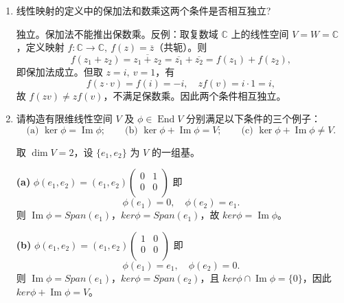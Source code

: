 \documentclass[lang=cn,12pt]{elegantbook}
\begin{document}
\begin{example}
    \begin{enumerate}
        \item[(1)] 线性映射的定义中的保加法和数乘这两个条件是否相互独立?
    
        \begin{solution}
            独立。保加法不能推出保数乘。反例：取复数域 \(\mathbb{C}\) 上的线性空间 \(V = W = \mathbb{C}\)，定义映射 \(f: \mathbb{C} \to \mathbb{C},\ f(z) = \overline{z}\)（共轭）。则
            \[
            f(z_1 + z_2) = \overline{z_1 + z_2} = \overline{z_1} + \overline{z_2} = f(z_1) + f(z_2),
            \]
            即保加法成立。但取 \(z = i,\ v = 1\)，有
            \[
            f(z \cdot v) = f(i) = -i,\quad z f(v) = i \cdot 1 = i,
            \]
            故 \(f(z v) \neq z f(v)\)，不满足保数乘。因此两个条件相互独立。
        \end{solution}
    
        \item[(2)] 请构造有限维线性空间 \(V\) 及 \(\phi \in \operatorname{End}V\) 分别满足以下条件的三个例子：
        \[
        \text{(a) } \ker \phi = \operatorname{Im} \phi;\qquad
        \text{(b) } \ker \phi + \operatorname{Im} \phi = V;\qquad
        \text{(c) } \ker \phi + \operatorname{Im} \phi \neq V.
        \]
    
        \begin{solution}
            取 \(\dim V = 2\)，设 \(\{e_1, e_2\}\) 为 \(V\) 的一组基。
    
            \textbf{(a)}  \(\phi(e_1,e_2) = (e_1,e_2)\begin{pmatrix}
                0 & 1 \\
                0 &  0\\
                \end{pmatrix}\) 即
            \[
            \phi(e_1) = 0,\quad \phi(e_2) = e_1.
            \]
            则 \(\operatorname{Im} \phi = Span(e_1)\)，\(ker \phi = Span(e_1)\)，故 \(ker \phi = \operatorname{Im} \phi\)。
    
            \textbf{(b)}  \(\phi(e_1,e_2) = (e_1,e_2) \begin{pmatrix}
                1 & 0 \\
                0 &  0\\
                \end{pmatrix}\) 即
            \[
            \phi(e_1) = e_1,\quad \phi(e_2) = 0.
            \]
            则 \(\operatorname{Im} \phi = Span(e_1)\)，\(ker \phi = Span(e_2)\)，且 \(ker \phi \cap \operatorname{Im} \phi = \{0\}\)，因此 \(ker \phi + \operatorname{Im} \phi = V\)。
    

\end{solution}
\end{enumerate}
\end{example}
\end{document}

